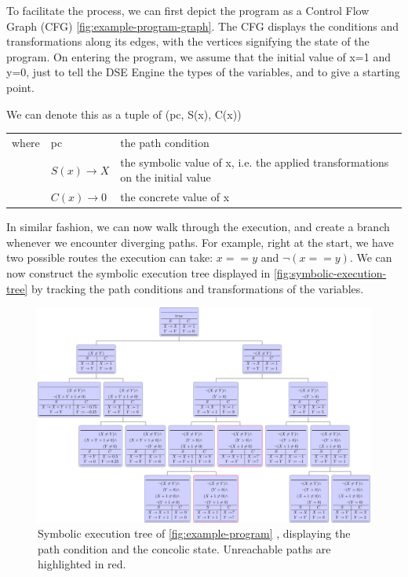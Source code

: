 To facilitate the process, we can first depict the program as a Control Flow Graph (CFG) \autoref{fig:example-program-graph}. 
The CFG displays the conditions and transformations along its edges, with the vertices signifying the state of the program.
On entering  the program, we assume that the initial value of x=1 and y=0, just to tell the DSE Engine the types of the variables, and to give a starting point. 

\begin{center}
    We can denote this as a tuple of (pc, S(x), C(x)) 
    \begin{table}[h]
        \begin{tabular}{lll}
            where & pc & the path condition \\
             & $S(x) \rightarrow X$& the symbolic value of x, i.e. the applied transformations on the initial value\\
             & $C(x) \rightarrow 0$& the concrete value of x\\
        \end{tabular}
    \end{table}
\end{center} 
In similar fashion, we can now walk through the execution, and create a branch whenever we encounter diverging paths.
For example, right at the start, we have two possible routes the execution can take: $x == y$ and $\neg(x == y)$.
We can now construct the symbolic execution tree displayed in \autoref{fig:symbolic-execution-tree} by tracking the path conditions and transformations of the variables.

\begin{figure}
  \centering
  \includegraphics[width=\textwidth]{../luatex/symexe/out/symexe.pdf}    
  \caption{Symbolic execution tree of \autoref{fig:example-program} , displaying the path condition and the concolic state. Unreachable paths are highlighted in red.}
  \label{fig:symbolic-execution-tree}
\end{figure}




